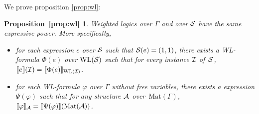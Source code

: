 \newtheorem*{WL}{Proposition~\ref{prop:wl}}

We prove proposition \ref{prop:wl}:

\begin{WL}
  Weighted logics over $\Gamma$ and \langprod over $\mathcal{S}$ have the same expressive power. More specifically,
  \begin{itemize}
  	\item for each \langprod expression $e$ over $\mathcal{S}$ such that $\mathcal{S}(e)=(1,1)$, there exists a WL-formula $\Phi(e)$ over $\text{WL}(\mathcal{S})$ such that for every instance $\mathcal{I}$ of~$\mathcal{S}$, 
  	$
  	\llbracket e \rrbracket(\mathcal{I}) = \llbracket \Phi(e) \rrbracket_{\text{WL}(\mathcal{I})}
  	$.
  	\item for each WL-formula $\varphi$ over $\Gamma$ without free variables, there exists a \langprod expression $\Psi(\varphi)$ such that for any structure $\mathcal{A}$ over~$\text{Mat}(\Gamma)$,
  	$
  	\llbracket \varphi \rrbracket_{\mathcal{A}}=\llbracket \Psi(\varphi) \rrbracket(\text{Mat}(\mathcal{A}))
  	$.
  \end{itemize}	
\end{WL}

